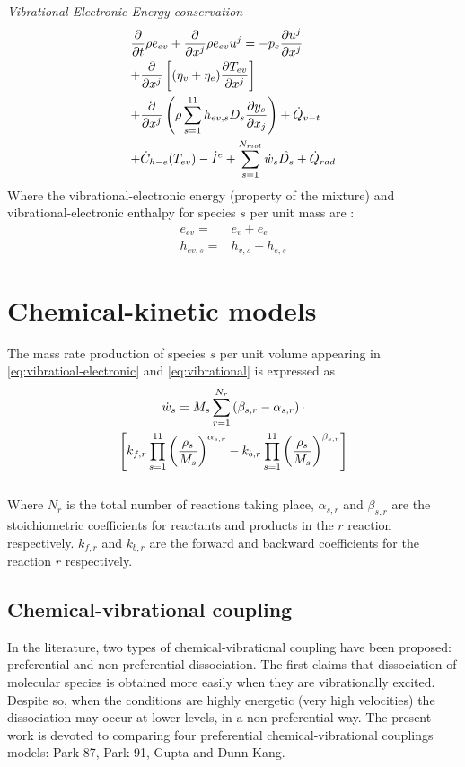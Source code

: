 \documentclass[11pt,a4paper,twocolumn]{article}
\begin{document}
\textit{Vibrational-Electronic Energy conservation}
\begin{multline}\label{eq:vibratioal-electronic}
     \frac{\partial}{\partial t}\rho e_{ev}+\frac{\partial}{\partial x^j}\rho e_{ev} u^j = -p_e\frac{\partial u^j}{\partial x^j}\hfill \\+\frac{\partial}{\partial x^j}\left[ (\eta_v+ \eta_e) \frac{\partial T_{ev}}{\partial x^j}\right]\hfill\\ +\frac{\partial}{\partial x^j}\left(\rho\sum_{s=1}^{11} h_{ev,s}D_s\frac{\partial y_s}{\partial x_j} \right) +\dot Q_{v-t}\hfill \\+\dot C_{h-e}(T_{ev})-\dot I^e + \sum_{s=1}^{N_{mol}}\dot w_s \hat{D_s}+ \dot Q_{rad} \hfill
\end{multline}
Where the vibrational-electronic energy (property of the mixture) and vibrational-electronic enthalpy for species $s$ per unit mass are :
\begin{align*}
    e_{ev} = & e_v + e_e\\
    h_{ev,s} = & h_{v,s}+h_{e,s}
\end{align*}
\section{Chemical-kinetic models}
The mass rate production of species $s$ per unit volume appearing in \ref{eq:vibratioal-electronic} and \ref{eq:vibrational} is expressed as \cite{gnoffo1989conservation, sarma2000physico}
\begin{multline}
    \dot w_s = M_s \sum_{r=1}^{N_r}\left( \beta_{s,r}-\alpha_{s,r}\right)\cdot\\\left[ k_{f,r}\prod_{s=1}^{11}\left(\frac{\rho_s}{M_s}\right)^{\alpha_{s,r}}\hfill- k_{b,r}\prod_{s=1}^{11}\left(\frac{\rho_s}{M_s}\right)^{\beta_{s,r}}\right]\hfill
\end{multline}\\
Where $N_r$ is the total number of reactions taking place, $\alpha_{s,r}$ and $\beta_{s,r}$ are the stoichiometric coefficients for reactants and products in the $r$ reaction respectively. $k_{f,r}$ and $k_{b,r}$ are the forward and backward coefficients for the reaction $r$ respectively.
\subsection{Chemical-vibrational coupling}
In the literature, two types of chemical-vibrational coupling have been proposed: preferential and non-preferential dissociation. The first claims that dissociation of molecular species is obtained more easily when they are vibrationally excited. Despite so, when the conditions are highly energetic (very high velocities) the dissociation may occur at lower levels, in a non-preferential way. The present work is devoted to comparing four preferential chemical-vibrational couplings models: Park-87, Park-91, Gupta and Dunn-Kang.
\end{document}
